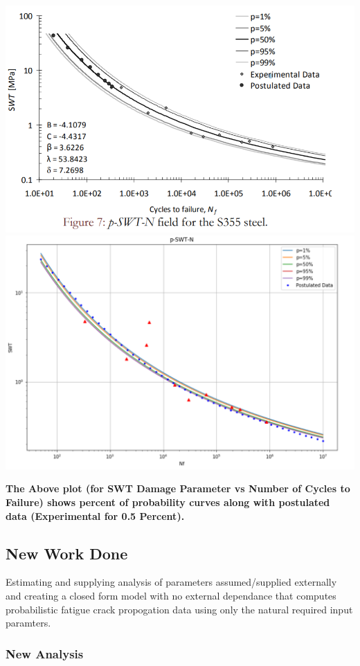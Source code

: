 \documentclass[11pt]{article}
\begin{document}
\includegraphics{images/p_s_n_paper.PNG}
\includegraphics{images/p_s_n_model.PNG}

\textbf{The Above plot (for SWT Damage Parameter vs Number of Cycles to
Failure) shows percent of probability curves along with postulated data
(Experimental for 0.5 Percent).}

\hypertarget{new-work-done}{%
\subsection{New Work Done}\label{new-work-done}}

Estimating and supplying analysis of parameters assumed/supplied
externally and creating a closed form model with no external dependance
that computes probabilistic fatigue crack propogation data using only
the natural required input paramters.

\hypertarget{new-analysis}{%
\subsubsection{New Analysis}\label{new-analysis}}
\end{document}
